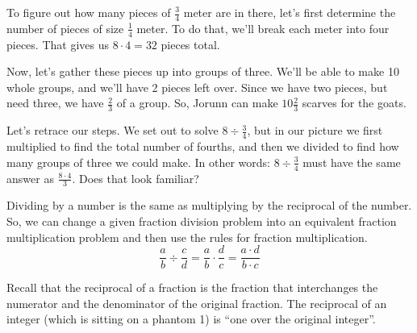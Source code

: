 To figure out how many pieces of $\frac{3}{4}$ meter are in there, let's first determine the number of pieces of size $\frac{1}{4}$ meter. To do that, we'll break each meter into four pieces. That gives us $8 \cdot 4 = 32$ pieces total.
\begin{center}
\end{center}

Now, let's gather these pieces up into groups of three. We'll be able to make 10 whole groups, and we'll have 2 pieces left over. Since we have two pieces, but need three, we have $\frac{2}{3}$ of a group. So, Jorunn can make $10\frac{2}{3}$ scarves for the goats.
\begin{center}
\end{center}

Let's retrace our steps. We set out to solve $8 \div \frac{3}{4}$, but in our picture we first multiplied to find the total number of fourths, and then we divided to find how many groups of three we could make. In other words: $8 \div \frac{3}{4}$ must have the same answer as $\frac{8 \cdot 4}{3}$. Does that look familiar?

\begin{boxeddef}
Dividing by a number is the same as multiplying by the reciprocal of the number. So, we can change a given fraction division problem into an equivalent fraction multiplication problem and then use the rules for fraction multiplication. \[\frac{a}{b} \div \frac{c}{d} = \frac{a}{b} \cdot \frac{d}{c} = \frac{a \cdot d}{b \cdot c}\]
\end{boxeddef}

Recall that the \gls{reciprocal} of a fraction is the fraction that interchanges the numerator and the denominator of the original fraction. The reciprocal of an integer (which is sitting on a phantom 1) is ``one over the original integer''.

